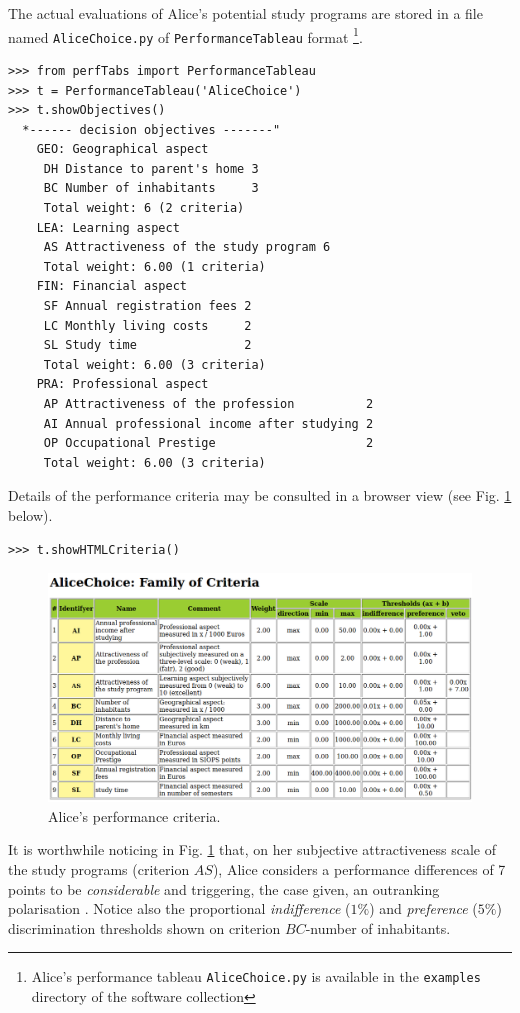 The actual evaluations of Alice's potential study programs are stored in a file named \texttt{AliceChoice.py} of \texttt{PerformanceTableau} format \footnote{Alice's performance tableau \texttt{AliceChoice.py} is available in the \texttt{examples} directory of the \Digraph software collection}.

\begin{lstlisting}[caption={Alice's performance tableau},label=list:12.1]
>>> from perfTabs import PerformanceTableau
>>> t = PerformanceTableau('AliceChoice')
>>> t.showObjectives()
  *------ decision objectives -------"
    GEO: Geographical aspect
     DH Distance to parent's home 3
     BC Number of inhabitants     3
     Total weight: 6 (2 criteria)
    LEA: Learning aspect
     AS Attractiveness of the study program 6
     Total weight: 6.00 (1 criteria)
    FIN: Financial aspect
     SF Annual registration fees 2
     LC Monthly living costs     2
     SL Study time               2
     Total weight: 6.00 (3 criteria)
    PRA: Professional aspect
     AP Attractiveness of the profession          2
     AI Annual professional income after studying 2
     OP Occupational Prestige                     2
     Total weight: 6.00 (3 criteria)
\end{lstlisting}

Details of the performance criteria may be consulted in a browser view (see Fig. \ref{fig:12.2} below).

\begin{lstlisting}
>>> t.showHTMLCriteria()
\end{lstlisting}
\begin{figure}[h]
\includegraphics[width=12cm]{Figures/aliceCriteria.png}
\caption{Alice's performance criteria.}
\label{fig:12.2}       %
\end{figure}

It is worthwhile noticing in Fig. \ref{fig:12.2} that, on her subjective attractiveness scale of the study programs (criterion $AS$), Alice considers a performance differences of 7 points to be \emph{considerable} and triggering, the case given, an outranking polarisation \citep{BIS-2013}. Notice also the proportional \emph{indifference} ($1\%$) and \emph{preference} ($5\%$) discrimination thresholds shown on criterion $BC$-number of inhabitants.

